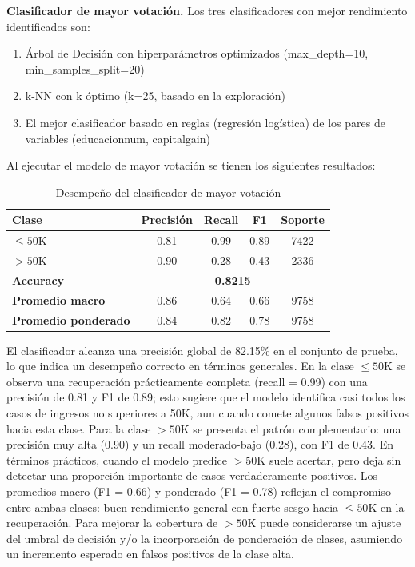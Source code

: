 \documentclass[12pt,a4paper]{article}
\begin{document}
\begin{enumerate}
      \textbf{Clasificador de mayor votación.}
      Los tres clasificadores con mejor rendimiento identificados son:

      \begin{enumerate}
        \item Árbol de Decisión con hiperparámetros optimizados (max\_depth=10, min\_samples\_split=20)
        \item k-NN con k óptimo (k=25, basado en la exploración)
        \item El mejor clasificador basado en reglas (regresión logística) de los pares de variables (educacion\-num, capital\-gain)
      \end{enumerate}

      Al ejecutar el modelo de mayor votación se tienen los siguientes resultados:

      \begin{table}[H]
        \centering
        \small
          \begin{tabular}{lcccc}
          \toprule
          \textbf{Clase} & \textbf{Precisión} & \textbf{Recall} & \textbf{F1} & \textbf{Soporte} \\
          \midrule
          $\leq 50$K & 0.81 & 0.99 & 0.89 & 7422 \\
          $>50$K     & 0.90 & 0.28 & 0.43 & 2336 \\
          \midrule
          \textbf{Accuracy} & \multicolumn{4}{c}{\textbf{0.8215}} \\
          \midrule
          \textbf{Promedio macro}     & 0.86 & 0.64 & 0.66 & 9758 \\
          \textbf{Promedio ponderado} & 0.84 & 0.82 & 0.78 & 9758 \\
          \bottomrule
          \end{tabular}
        \caption{Desempeño del clasificador de mayor votación}
        \label{tab:clasificador_major_vote}
      \end{table}

      El clasificador alcanza una precisión global de 82.15\% en el conjunto de prueba, lo que indica un desempeño correcto en términos generales. 
      En la clase \(\leq 50\text{K}\) se observa una recuperación prácticamente completa (recall = 0.99) con una precisión de 0.81 y F1 de 0.89; 
      esto sugiere que el modelo identifica casi todos los casos de ingresos no superiores a 50K, aun cuando comete algunos falsos positivos hacia 
      esta clase. Para la clase \(>50\text{K}\) se presenta el patrón complementario: una precisión muy alta (0.90) y un recall moderado-bajo (0.28), 
      con F1 de 0.43. En términos prácticos, cuando el modelo predice \(>50\text{K}\) suele acertar, pero deja sin detectar una proporción importante 
      de casos verdaderamente positivos. Los promedios macro (F1 = 0.66) y ponderado (F1 = 0.78) reflejan el compromiso entre ambas clases: buen 
      rendimiento general con fuerte sesgo hacia \(\leq 50\text{K}\) en la recuperación. Para mejorar la cobertura de \(>50\text{K}\) puede 
      considerarse un ajuste del umbral de decisión y/o la incorporación de ponderación de clases, asumiendo un incremento esperado en falsos 
      positivos de la clase alta.


\end{enumerate}
\end{document}
